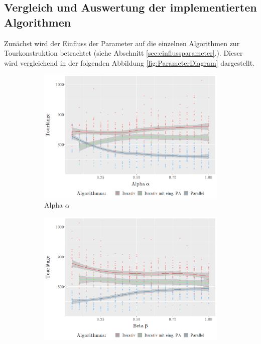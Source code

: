 \documentclass[doktyp=barbeit, sprache=german]{TUBAFarbeiten}
\begin{document}
\subsection{Vergleich und Auswertung der implementierten Algorithmen}
Zunächst wird der Einfluss der Parameter auf die einzelnen Algorithmen zur Tourkonstruktion betrachtet (siehe Abschnitt \ref{sec:einflussparameter}.). Dieser wird vergleichend in der folgenden Abbildung \ref{fig:ParameterDiagram} dargestellt. 
\begin{figure}
        \centering
        \begin{subfigure}[b]{0.475\textwidth}
            \centering
            \includegraphics[width=\textwidth]{images/diagramalpha}
            \caption{Alpha $\alpha$}               
            \label{fig:iterativeAlpha}
        \end{subfigure}
        \hfill
        \begin{subfigure}[b]{0.475\textwidth}  
            \centering 
            \includegraphics[width=\textwidth]{images/diagrambeta}

\end{subfigure}
\end{figure}
\end{document}
